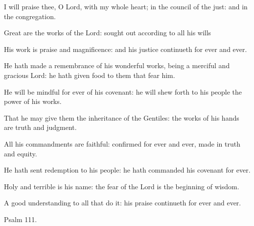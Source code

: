 \documentclass[letterpaper,12pt]{article} %
\begin{document}
\begin{multicols}{2}
\begin{psalmverses}[0]
\item I will praise thee, O Lord, with my whole heart; in the council of the just: and in the congregation.
\item Great are the works of the Lord: sought out according to all his wills
\item His work is praise and magnificence: and his justice continueth for ever and ever.
\item He hath made a remembrance of his wonderful works, being a merciful and gracious Lord: he hath given food to them that fear him.
\item He will be mindful for ever of his covenant: he will shew forth to his people the power of his works.
\item That he may give them the inheritance of the Gentiles: the works of his hands are truth and judgment.
\item All his commandments are faithful: confirmed for ever and ever, made in truth and equity.
\item He hath sent redemption to his people: he hath commanded his covenant for ever.
\item Holy and terrible is his name: the fear of the Lord is the beginning of wisdom.
\item A good understanding to all that do it: his praise continueth for ever and ever.
\end{psalmverses}
\end{multicols}
\pagebreak

\large
{}
\vspace{-3ex}
\begin{center}{\Large Psalm 111.}\end{center}
\normalsize
\end{document}

